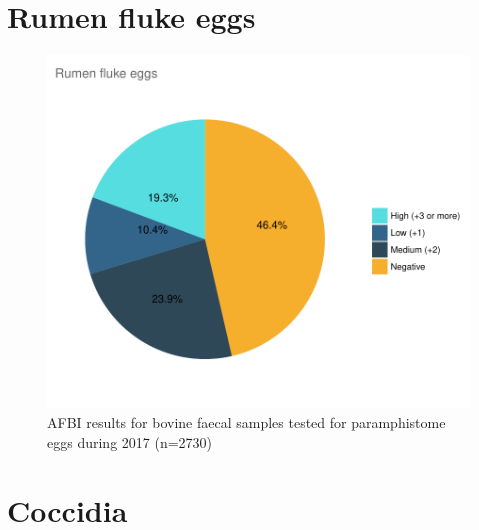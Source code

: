 \documentclass[]{book}
\begin{document}
\section{Rumen fluke eggs}\label{rumen-fluke-eggs}

\begin{figure}

{\centering \includegraphics{AFBI_files/figure-latex/unnamed-chunk-57-1} 

}

\caption{AFBI results for bovine faecal samples tested for paramphistome eggs during 2017 (n=2730)}\label{fig:unnamed-chunk-57}
\end{figure}

\section{Coccidia}\label{coccidia}
\end{document}
